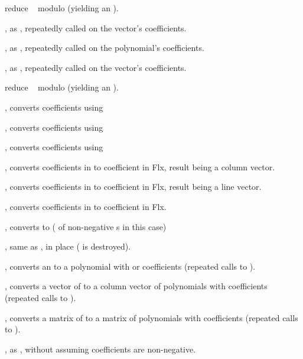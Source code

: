  reduce ~ modulo 
(yielding an ).

, as , repeatedly
called on the vector's coefficients.

, as ,
repeatedly called on the polynomial's coefficients.

, as ,
repeatedly called on the vector's coefficients.

 reduce ~ modulo 
(yielding an ).

, converts coefficients using 

, converts coefficients using 

, converts coefficients using 

, converts coefficients in 
to coefficient in Flx, result being a column vector.

, converts coefficients in 
to coefficient in Flx, result being a line vector.

, converts coefficients in 
to coefficient in Flx.


, converts to  ( of non-negative
s in this case)

, same as , in place
( is destroyed).

, converts an  to a polynomial with
 or  coefficients (repeated calls to ).

, converts a vector of  to a column
vector of polynomials with  coefficients (repeated calls to
).

, converts a matrix of  to a matrix of
polynomials with  coefficients (repeated calls to ).

, as , without assuming
coefficients are non-negative.

